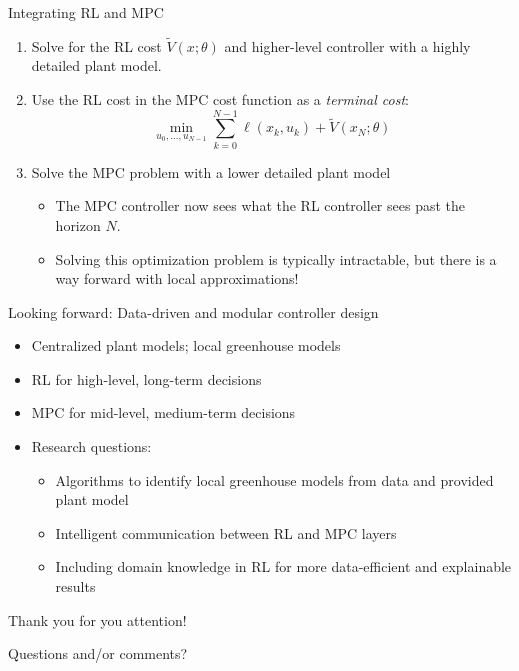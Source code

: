 \documentclass[xcolor=dvipsnames,aspectratio=169]{beamer}
\begin{document}
\begin{frame}[noframenumbering]{Integrating RL and MPC}
	\begin{enumerate}
		\item Solve for the RL cost $\tilde{V}(x;\theta)$ and higher-level 
		controller with a highly detailed plant model.
		\pause
		\item Use the RL cost in the MPC cost function as a \textit{terminal 
			cost}: 
		\begin{equation*}
			\min_{u_0,\dots,u_{N-1}} \sum_{k=0}^{N-1} \ell(x_k,u_k) + 
			\tilde{V}(x_N;\theta)
		\end{equation*}
		\item Solve the MPC problem with a lower detailed plant model
		\begin{itemize}
			\pause
			\item The MPC controller now sees what the RL controller sees past 
			the horizon $N$. 
			\pause
			\item Solving this optimization problem is typically intractable, 
			but there is a way forward with local approximations!
		\end{itemize} 
	\end{enumerate}
\end{frame}

\begin{frame}[noframenumbering]{Looking forward: Data-driven and modular 
controller design}
	\begin{itemize}
		\item Centralized plant models; local greenhouse models
		\pause
		\item RL for high-level, long-term decisions
		\pause
		\item MPC for mid-level, medium-term decisions
		\pause
		\item Research questions:
		\begin{itemize}
			\pause
			\item Algorithms to identify local greenhouse models from data and 
			provided plant model
			\pause
			\item Intelligent communication between RL and MPC layers
			\pause
			\item Including domain knowledge in RL for more data-efficient and 
			explainable results
		\end{itemize}
	\end{itemize}

	\pause
	\bigskip

	\begin{center}
		Thank you for you attention!
		
		\bigskip
		
		Questions and/or comments?
	\end{center}
\end{frame}
\end{document}
